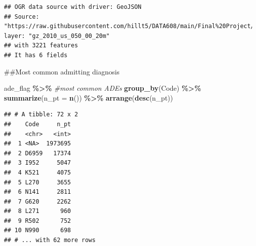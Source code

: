 \documentclass[preprint, 3p,
authoryear]{elsarticle} %
\newenvironment{Shaded}{\begin{snugshade}}{\end{snugshade}}
\newcommand{\CommentTok}[1]{\textcolor[rgb]{0.56,0.35,0.01}{\textit{#1}}}
\newcommand{\DataTypeTok}[1]{\textcolor[rgb]{0.13,0.29,0.53}{#1}}
\newcommand{\DecValTok}[1]{\textcolor[rgb]{0.00,0.00,0.81}{#1}}
\newcommand{\KeywordTok}[1]{\textcolor[rgb]{0.13,0.29,0.53}{\textbf{#1}}}
\newcommand{\NormalTok}[1]{#1}
\newcommand{\OperatorTok}[1]{\textcolor[rgb]{0.81,0.36,0.00}{\textbf{#1}}}
\newcommand{\StringTok}[1]{\textcolor[rgb]{0.31,0.60,0.02}{#1}}
\begin{document}
\begin{verbatim}
## OGR data source with driver: GeoJSON 
## Source: "https://raw.githubusercontent.com/hillt5/DATA608/main/Final%20Project/gz_2010_us_050_00_20m.json", layer: "gz_2010_us_050_00_20m"
## with 3221 features
## It has 6 fields
\end{verbatim}

\begin{Shaded}
\end{Shaded}

\#\#Most common admitting diagnosis

\begin{Shaded}
\begin{Highlighting}[]
\NormalTok{ade\_flag }\OperatorTok{\%\textgreater{}\%}\StringTok{ }\CommentTok{\#most common ADEs}
\StringTok{  }\KeywordTok{group\_by}\NormalTok{(Code) }\OperatorTok{\%\textgreater{}\%}
\StringTok{  }\KeywordTok{summarize}\NormalTok{(}\DataTypeTok{n\_pt =} \KeywordTok{n}\NormalTok{()) }\OperatorTok{\%\textgreater{}\%}
\StringTok{  }\KeywordTok{arrange}\NormalTok{(}\KeywordTok{desc}\NormalTok{(n\_pt))}
\end{Highlighting}
\end{Shaded}

\begin{verbatim}
## # A tibble: 72 x 2
##    Code     n_pt
##    <chr>   <int>
##  1 <NA>  1973695
##  2 D6959   17374
##  3 I952     5047
##  4 K521     4075
##  5 L270     3655
##  6 N141     2811
##  7 G620     2262
##  8 L271      960
##  9 R502      752
## 10 N990      698
## # ... with 62 more rows
\end{verbatim}
\end{document}
